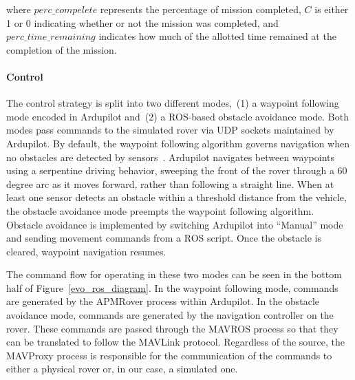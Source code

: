 \noindent
where $perc\_compelete$ represents the percentage of
mission completed, $C$ is either 1 or 0
indicating whether or not the mission was completed, and
$perc\_time\_remaining$ indicates how much of the allotted
time remained at the completion of the mission.


\paragraph{Control}
The control strategy is split into two different modes,~(1) a waypoint following mode
encoded in Ardupilot and~(2) a ROS-based obstacle avoidance mode. 
%
Both modes pass commands to the simulated rover via UDP sockets maintained by Ardupilot. 
%
By default, the waypoint following algorithm
governs navigation when no obstacles are detected by sensors~\cite{Ardupilot.Auto}.
%
%
Ardupilot navigates between waypoints using a serpentine driving behavior, sweeping the front of the rover through a 60 degree arc as it moves forward, rather than following a straight line. 
%
When at least one sensor detects an obstacle within a threshold distance from the vehicle,
the obstacle avoidance mode preempts the waypoint following algorithm.
%
Obstacle avoidance is
implemented by switching Ardupilot into ``Manual'' mode and sending movement commands from a ROS script.
%
Once the obstacle is cleared, waypoint navigation resumes.  




The command flow for operating in these two modes can be seen in the bottom half of Figure~\ref{evo_ros_diagram}. In the waypoint following mode, commands are generated by the APMRover process within Ardupilot. In the obstacle avoidance mode, commands are generated by the navigation controller on the rover. These commands are passed through the MAVROS process so that they can be translated to follow the MAVLink protocol. Regardless of the source, the MAVProxy process is responsible for the communication of the commands to either a physical rover or, in our case, a simulated one.
%

